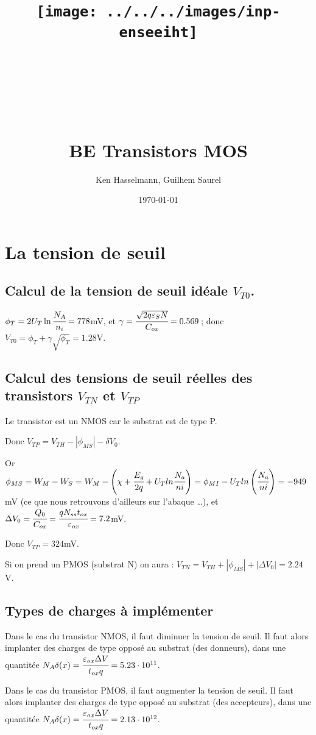 \documentclass[10pt]{article}
\title{\texttt{[image: ../../../images/inp-enseeiht]} \\ ~ \\ ~ \\ ~ \\ ~ \\ BE Transistors MOS}
\author{Ken Hasselmann, Guilhem Saurel}
\date{\today}
\begin{document}
 \begin{titlepage}
  \maketitle
  \tableofcontents
 \end{titlepage}

 \section{La tension de seuil}
  \subsection{Calcul de la tension de seuil idéale $V_{T0}$.}
   $\phi_T = 2 U_T \ln\cfrac{N_A}{n_i} = 778$mV,
   et $\gamma = \cfrac{\sqrt{2q\varepsilon_SN}}{C_{ox}} = 0.569$\,;
   donc $V_{T0} = \phi_T + \gamma\sqrt{\phi_T} = 1.28$V.

  \subsection{Calcul des tensions de seuil réelles des transistors $V_{TN}$ et $V_{TP}$}
   Le transistor est un NMOS car le substrat est de type P.
   
   Donc  $V_{TP} = V_{TH} - |\phi_{MS}| - \delta{V_0}$. %

   
   Or $\phi_{MS} = W_M - W_S = W_M - \left(\chi + \cfrac{E_g}{2q} + U_T ln \cfrac{N_a}{ni} \right) = \phi_{MI} - U_T ln \left(\cfrac{N_a}{ni}\right) = -949$mV (ce que nous retrouvons d’ailleurs sur l’abaque …),
   et $\Delta V_0 = \cfrac{Q_0}{C_{ox}} = \cfrac{q N_{ss} t_{ox}}{\varepsilon_{ox}} = 7.2$mV.
   
   Donc $V_{TP} = 324$mV.
      
   Si on prend un PMOS (substrat N) on aura :
   $V_{TN} = V_{TH} + |\phi_{MS}| + |\Delta{V_0}| = 2.24$V.

  \subsection{Types de charges à implémenter}
  Dans le cas du transistor NMOS, il faut diminuer la tension de seuil. 
  Il faut alors implanter des charges de type opposé au substrat (des donneurs),
  dans une quantitée 
  $N_A \delta(x) = \cfrac{\varepsilon_{ox} \Delta V}{t_{ox} q} = 5.23\cdot 10^{11}$.

  Dans le cas du transistor PMOS, il faut augmenter la tension de seuil. 
  Il faut alors implanter des charges de type opposé au substrat (des accepteurs),
  dans une quantitée  
  $N_A \delta(x) = \cfrac{\varepsilon_{ox} \Delta V}{t_{ox} q} = 2.13\cdot 10^{12}$.
  
\end{document}
